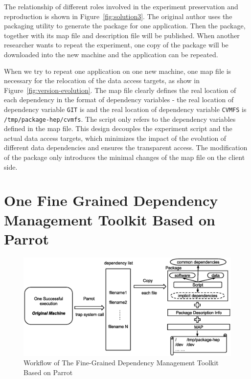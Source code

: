 \documentclass{sig-alternate}
\begin{document}
The relationship of different roles involved in the experiment preservation and
reproduction is shown in Figure~\ref{fig:solution3}.  The original author uses the packaging utility to generate the package for one application.
Then the package, together with
its map file and description file will be published. When
another researcher wants to repeat the experiment, one copy of the package will be downloaded into the new machine and the application can be repeated.

When we try to repeat one application on one new machine, one map file is necessary for the relocation of the data access targets, as
show in Figure~\ref{fig:version-evolution}. 
The map file clearly defines the real location of each dependency in the format of dependency variables - the real location of dependency variable {\tt GIT} is  and the real location of dependency variable {\tt CVMFS}
is {\tt /tmp/package-hep/cvmfs}.
The script only refers to the dependency variables defined in the map file.
This design decouples the experiment script and the actual data access targets, which minimizes the impact of the evolution of different data dependencies
and ensures the transparent access.
The modification of the package only introduces the minimal changes of the map file on the client side.

\section{One Fine Grained Dependency Management Toolkit Based on Parrot}

\begin{figure}
\centering
\includegraphics[width=1.6\columnwidth]{workflow-parrot.eps}
\caption{Workflow of The Fine-Grained Dependency Management Toolkit Based on Parrot}
\label{fig:workflow-parrot}
\end{figure}
\end{document}
